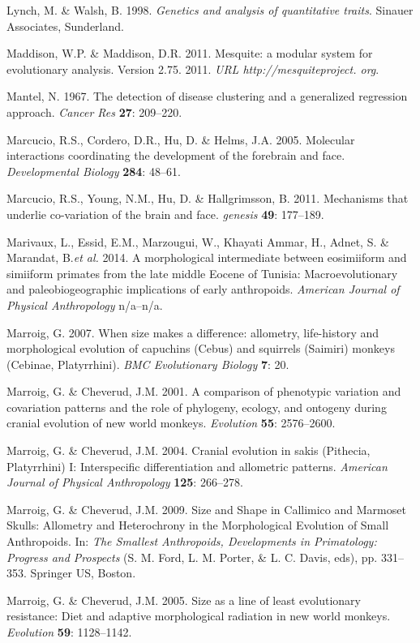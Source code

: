 \documentclass[12pt,twoside]{report}
\begin{document}
Lynch, M. \& Walsh, B. 1998. \emph{Genetics and analysis of quantitative
traits}. Sinauer Associates, Sunderland.

Maddison, W.P. \& Maddison, D.R. 2011. Mesquite: a modular system for
evolutionary analysis. Version 2.75. 2011. \emph{URL
http://mesquiteproject. org}.

Mantel, N. 1967. The detection of disease clustering and a generalized
regression approach. \emph{Cancer Res} \textbf{27}: 209--220.

Marcucio, R.S., Cordero, D.R., Hu, D. \& Helms, J.A. 2005. Molecular
interactions coordinating the development of the forebrain and face.
\emph{Developmental Biology} \textbf{284}: 48--61.

Marcucio, R.S., Young, N.M., Hu, D. \& Hallgrimsson, B. 2011. Mechanisms
that underlie co-variation of the brain and face. \emph{genesis}
\textbf{49}: 177--189.

Marivaux, L., Essid, E.M., Marzougui, W., Khayati Ammar, H., Adnet, S.
\& Marandat, B.\emph{et al.} 2014. A morphological intermediate between
eosimiiform and simiiform primates from the late middle Eocene of
Tunisia: Macroevolutionary and paleobiogeographic implications of early
anthropoids. \emph{American Journal of Physical Anthropology} n/a--n/a.

Marroig, G. 2007. When size makes a difference: allometry, life-history
and morphological evolution of capuchins (Cebus) and squirrels (Saimiri)
monkeys (Cebinae, Platyrrhini). \emph{BMC Evolutionary Biology}
\textbf{7}: 20.

Marroig, G. \& Cheverud, J.M. 2001. A comparison of phenotypic variation
and covariation patterns and the role of phylogeny, ecology, and
ontogeny during cranial evolution of new world monkeys. \emph{Evolution}
\textbf{55}: 2576--2600.

Marroig, G. \& Cheverud, J.M. 2004. Cranial evolution in sakis
(Pithecia, Platyrrhini) I: Interspecific differentiation and allometric
patterns. \emph{American Journal of Physical Anthropology} \textbf{125}:
266--278.

Marroig, G. \& Cheverud, J.M. 2009. Size and Shape in Callimico and
Marmoset Skulls: Allometry and Heterochrony in the Morphological
Evolution of Small Anthropoids. In: \emph{The Smallest Anthropoids,
Developments in Primatology: Progress and Prospects} (S. M. Ford, L. M.
Porter, \& L. C. Davis, eds), pp. 331--353. Springer US, Boston.

Marroig, G. \& Cheverud, J.M. 2005. Size as a line of least evolutionary
resistance: Diet and adaptive morphological radiation in new world
monkeys. \emph{Evolution} \textbf{59}: 1128--1142.
\end{document}
